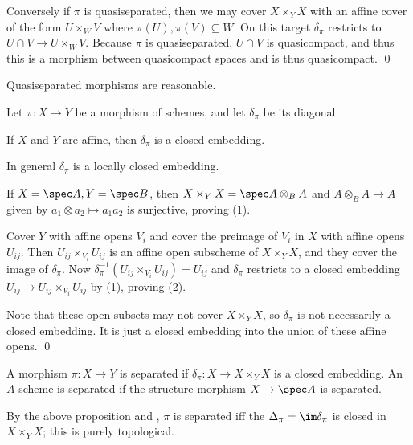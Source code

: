     Conversely if $\pi$ is quasiseparated, then we may cover $X\times_YX$ with an affine cover of the form
    $U\times_WV$ where $\pi(U),\pi(V)\subseteq W$.
    On this target $\delta_\pi$ restricts to $U\cap V\to U\times_WV$.
    Because $\pi$ is quasiseparated, $U\cap V$ is quasicompact, and thus this is a morphism between
    quasicompact spaces and is thus quasicompact.
    \qed

\eproof

\bcoro

    Quasiseparated morphisms are reasonable.

\ecoro

\bprop[name={diagonallc}]

    Let $\pi\colon X\to Y$ be a morphism of schemes, and let $\delta_\pi$ be its diagonal.
    \benum
        \item If $X$ and $Y$ are affine, then $\delta_\pi$ is a closed embedding.
        \item In general $\delta_\pi$ is a locally closed embedding.
    \eenum

\eprop

\bproof

    If $X=\spec A,Y=\spec B$, then $X\times_YX=\spec A\otimes_BA$ and $A\otimes_BA\to A$ given by
    $a_1\otimes a_2\mapsto a_1a_2$ is surjective, proving (1).

    Cover $Y$ with affine opens $V_i$ and cover the preimage of $V_i$ in $X$ with affine opens $U_{ij}$.
    Then $U_{ij}\times_{V_i}U_{ij}$ is an affine open subscheme of $X\times_YX$, and they cover the image
    of $\delta_\pi$.
    Now $\delta_\pi^{-1}(U_{ij}\times_{V_i}U_{ij})=U_{ij}$ and $\delta_\pi$ restricts to a closed
    embedding $U_{ij}\to U_{ij}\times_{V_i}U_{ij}$ by (1), proving (2).

    Note that these open subsets may not cover $X\times_YX$, so $\delta_\pi$ is not necessarily a closed
    embedding.
    It is just a closed embedding into the union of these affine opens.
    \qed

\eproof

\bdefn

    A morphism $\pi\colon X\to Y$ is {\emphcolor separated} if $\delta_\pi\colon X\to X\times_YX$ is a
    closed embedding.
    An $A$-scheme is {\emphcolor separated} if the structure morphism $X\to\spec A$ is separated.

    By the above proposition and , $\pi$ is separated iff the
    $\Delta_\pi=\im\delta_\pi$ is closed in $X\times_YX$; this is purely topological.

